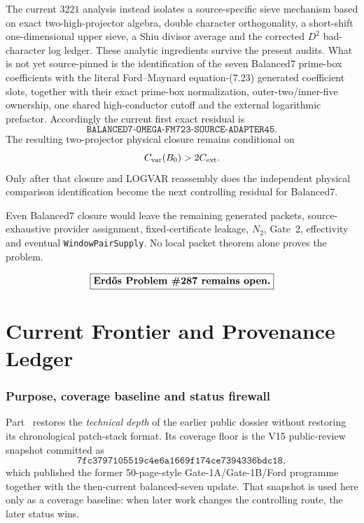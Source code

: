\documentclass[11pt]{article}
\theoremstyle{definition}
\newcommand{\1}{\mathbf 1}
\begin{document}
The current $3221$ analysis instead isolates a source-specific sieve mechanism based on
exact two-high-projector algebra, double character orthogonality, a short-shift
one-dimensional upper sieve, a Shiu divisor average and the corrected $D^2$ bad-character
log ledger.  These analytic ingredients survive the present audits.  What is not yet
source-pinned is the identification of the seven Balanced7 prime-box coefficients with the
literal Ford--Maynard equation-(7.23) generated coefficient slots, together with their
exact prime-box normalization, outer-two/inner-five ownership, one shared high-conductor
cutoff and the external logarithmic prefactor.  Accordingly the current first exact
residual is
\[
\boxed{\texttt{BALANCED7-OMEGA-FM723-SOURCE-ADAPTER45}.}
\]
The resulting two-projector physical closure remains conditional on
\[
C_{\rm var}(B_0)>2C_{\rm ext}.
\]
Only after that closure and LOGVAR reassembly does the independent physical comparison
identification become the next controlling residual for Balanced7.

Even Balanced7 closure would leave the remaining generated packets, source-exhaustive
provider assignment, fixed-certificate leakage, $N_2$, Gate~2, effectivity and eventual
\texttt{WindowPairSupply}.  No local packet theorem alone proves the problem.

\[
\boxed{\textbf{Erd\H{o}s Problem \#287 remains open.}}
\]


\part{Current Frontier and Provenance Ledger}
\label{part:technical-ledger}

\section{Purpose, coverage baseline and status firewall}
\label{sec:technical-baseline}

Part~\ref{part:technical-ledger} restores the \emph{technical depth} of the earlier public
dossier without restoring its chronological patch-stack format.  Its coverage floor is the
V15 public-review snapshot committed as
\[
\boxed{\texttt{7fc3797105519c4e6a1669f174ce7394336bdc18}},
\]
which published the former 50-page-style Gate-1A/Gate-1B/Ford programme together with the
then-current balanced-seven update.  That snapshot is used here only as a coverage baseline:
when later work changes the controlling route, the later status wins.
\end{document}
